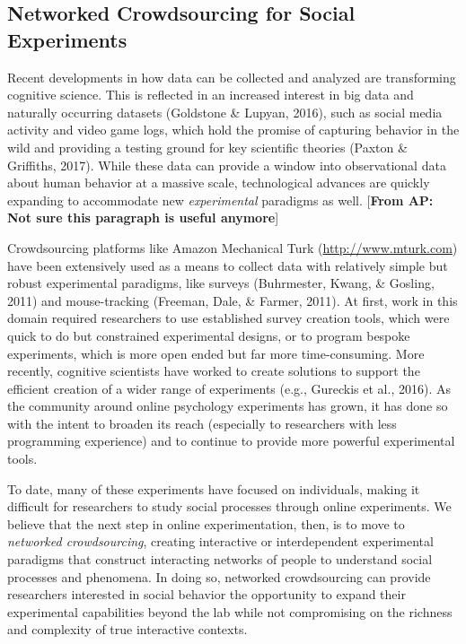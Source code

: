 \documentclass[10pt, letterpaper]{article}
\begin{document}
\subsection{Networked Crowdsourcing for Social
Experiments}\label{networked-crowdsourcing-for-social-experiments}

Recent developments in how data can be collected and analyzed are
transforming cognitive science. This is reflected in an increased
interest in big data and naturally occurring datasets (Goldstone \&
Lupyan, 2016), such as social media activity and video game logs, which
hold the promise of capturing behavior in the wild and providing a
testing ground for key scientific theories (Paxton \& Griffiths, 2017).
While these data can provide a window into observational data about
human behavior at a massive scale, technological advances are quickly
expanding to accommodate new \emph{experimental} paradigms as well.
{[}\textbf{From AP: Not sure this paragraph is useful anymore}{]}

Crowdsourcing platforms like Amazon Mechanical Turk
(\url{http://www.mturk.com}) have been extensively used as a means to
collect data with relatively simple but robust experimental paradigms,
like surveys (Buhrmester, Kwang, \& Gosling, 2011) and mouse-tracking
(Freeman, Dale, \& Farmer, 2011). At first, work in this domain required
researchers to use established survey creation tools, which were quick
to do but constrained experimental designs, or to program bespoke
experiments, which is more open ended but far more time-consuming. More
recently, cognitive scientists have worked to create solutions to
support the efficient creation of a wider range of experiments (e.g.,
Gureckis et al., 2016). As the community around online psychology
experiments has grown, it has done so with the intent to broaden its
reach (especially to researchers with less programming experience) and
to continue to provide more powerful experimental tools.

To date, many of these experiments have focused on individuals, making
it difficult for researchers to study social processes through online
experiments. We believe that the next step in online experimentation,
then, is to move to \emph{networked crowdsourcing}, creating interactive
or interdependent experimental paradigms that construct interacting
networks of people to understand social processes and phenomena. In
doing so, networked crowdsourcing can provide researchers interested in
social behavior the opportunity to expand their experimental
capabilities beyond the lab while not compromising on the richness and
complexity of true interactive contexts.
\end{document}
